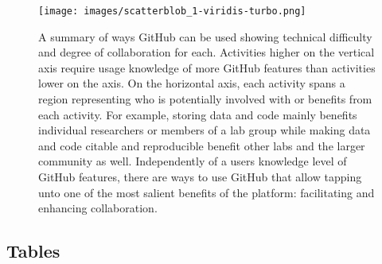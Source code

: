 \begin{figure}
\hypertarget{fig:scatterblob}{%
\centering
\texttt{[image: images/scatterblob\_1-viridis-turbo.png]}
\caption{A summary of ways GitHub can be used showing technical difficulty and degree of collaboration for each. Activities higher on the vertical axis require usage knowledge of more GitHub features than activities lower on the axis. On the horizontal axis, each activity spans a region representing who is potentially involved with or benefits from each activity. For example, storing data and code mainly benefits individual researchers or members of a lab group while making data and code citable and reproducible benefit other labs and the larger community as well. Independently of a users knowledge level of GitHub features, there are ways to use GitHub that allow tapping unto one of the most salient benefits of the platform: facilitating and enhancing collaboration.}\label{fig:scatterblob}
}
\end{figure}

\hypertarget{tables}{%
\subsection{Tables}\label{tables}}

